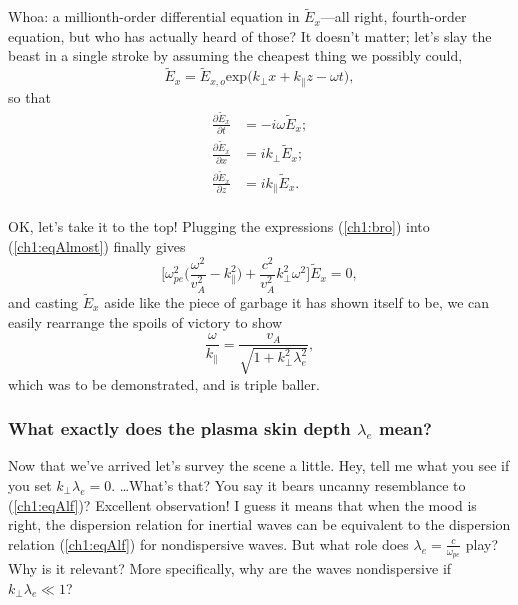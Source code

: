 Whoa: a millionth-order differential equation in $\tilde E_x$---all right,
fourth-order equation, but who has actually heard of those? It doesn't matter;
let's slay the beast in a single stroke by assuming the cheapest thing we possibly could,
\begin{equation*}
  \tilde E_x = \tilde E_{x,o} \mathrm{exp} \Big ( k_\perp x + k_\parallel z - \omega t \Big ),
\end{equation*}
so that 
\begin{equation} \label{ch1:bro}
  \begin{alignedat}{2}
\frac{\partial \tilde E_x}{\partial t} &=  -i \omega \tilde E_x; \\
\frac{\partial \tilde E_x}{\partial x} &=   i k_\perp \tilde E_x; \\
\frac{\partial \tilde E_x}{\partial z} &=   i k_\parallel \tilde E_x. \\
  \end{alignedat}
\end{equation}

OK, let's take it to the top! Plugging the expressions (\ref{ch1:bro}) into
(\ref{ch1:eqAlmost}) finally gives
\begin{equation} \label{ch1:bro}
  \Big [ \omega_{pe}^2 \Big ( \dfrac{\omega^2}{v_A^2} - k_\parallel^2 \Big ) + \dfrac{c^2}{v_A^2} k_\perp^2 \omega^2 \Big ] \tilde E_x = 0,
\end{equation}
and casting $\tilde E_x$ aside like the piece of garbage it has shown itself to
be, we can easily rearrange the spoils of victory to show
\begin{equation}
  \dfrac{\omega}{k_\parallel} = \dfrac{v_A}{ \sqrt{1 + k_\perp^2 \lambda_e^2 }},
\end{equation}
which was to be demonstrated, and is triple baller. 

\subsubsection{What exactly does the plasma skin depth $\lambda_e$ mean?} 

Now that we've arrived let's survey the scene a little. Hey, tell me what you
see if you set $k_\perp \lambda_e = 0$. \dots What's that? You say it bears
uncanny resemblance to (\ref{ch1:eqAlf})? Excellent observation! I guess it
means that when the mood is right, the dispersion relation for inertial \Alf
waves can be equivalent to the dispersion relation (\ref{ch1:eqAlf}) for
nondispersive \Alf waves. But what role does $\lambda_e = \frac{c}{\omega_{pe}}$
play?  Why is it relevant? More specifically, why are the waves nondispersive if
$k_\perp \lambda_e \ll 1$?

